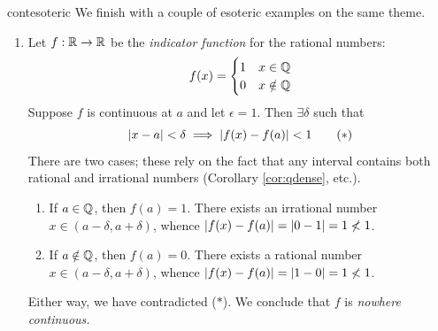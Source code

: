 \begin{examples}{}{contesoteric}
	We finish with a couple of esoteric examples on the same theme.
	\begin{enumerate}

		\item Let $f:\mathbb{R}\to\mathbb{R}$ be the \emph{indicator function} for the rational numbers:
		\[
			f(x)=
			\begin{cases}
				1&x\in\mathbb{Q}\\
				0&x\notin\mathbb{Q}
			\end{cases}
		\]
		Suppose $f$ is continuous at $a$ and let $\epsilon=1$. Then $\exists\delta$ such that 
		\[
			\left| x-a\right|<\delta\implies \left| f(x)-f(a)\right|<1 \tag{$\ast$}
		\]
		There are two cases; these rely on the fact that any interval contains both rational and irrational numbers (Corollary \ref{cor:qdense}, etc.).
		\begin{enumerate}
			\item If $a\in\mathbb{Q}$, then $f(a)=1$. There exists an irrational number $x\in(a-\delta,a+\delta)$, whence $\left| f(x)-f(a)\right|=\left| 0-1\right|=1\not <1$.
			\item If $a\notin\mathbb{Q}$, then $f(a)=0$. There exists a rational number $x\in(a-\delta,a+\delta)$, whence $\left| f(x)-f(a)\right|=\left| 1-0\right|=1\not <1$.
		\end{enumerate}
		Either way, we have contradicted ($\ast$). We conclude that $f$ is \emph{nowhere continuous.} 
	

\end{enumerate}
\end{examples}
